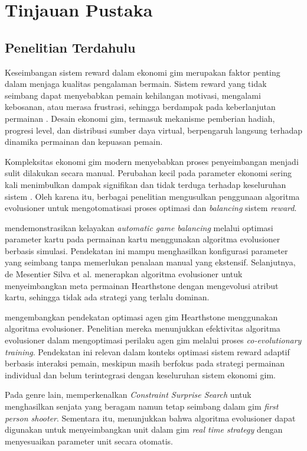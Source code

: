 \chapter{Tinjauan Pustaka}\label{ch:literature}

\section{Penelitian Terdahulu}\label{}

Keseimbangan sistem reward dalam ekonomi gim merupakan faktor penting dalam menjaga kualitas pengalaman bermain. Sistem reward yang tidak seimbang dapat menyebabkan pemain kehilangan motivasi, mengalami kebosanan, atau merasa frustrasi, sehingga berdampak pada keberlanjutan permainan \citep{Holmberg2021}. Desain ekonomi gim, termasuk mekanisme pemberian hadiah, progresi level, dan distribusi sumber daya virtual, berpengaruh langsung terhadap dinamika permainan dan kepuasan pemain.

Kompleksitas ekonomi gim modern menyebabkan proses penyeimbangan menjadi sulit dilakukan secara manual. Perubahan kecil pada parameter ekonomi sering kali menimbulkan dampak signifikan dan tidak terduga terhadap keseluruhan sistem \citep{Volz2016}. Oleh karena itu, berbagai penelitian mengusulkan penggunaan algoritma evolusioner untuk mengotomatisasi proses optimasi dan \textit{balancing} sistem \textit{reward}.

\cite{Volz2016} mendemonstrasikan kelayakan \textit{automatic game balancing} melalui optimasi parameter kartu pada permainan kartu menggunakan algoritma evolusioner berbasis simulasi. Pendekatan ini mampu menghasilkan konfigurasi parameter yang seimbang tanpa memerlukan penalaan manual yang ekstensif. Selanjutnya, de Mesentier Silva et al. \cite{deMesentierSilva2019} menerapkan algoritma evolusioner untuk menyeimbangkan meta permainan Hearthstone dengan mengevolusi atribut kartu, sehingga tidak ada strategi yang terlalu dominan.

\cite{garcia2020optimizing} mengembangkan pendekatan optimasi agen gim Hearthstone menggunakan algoritma evolusioner. Penelitian mereka menunjukkan efektivitas algoritma evolusioner dalam mengoptimasi perilaku agen gim melalui proses \textit{co-evolutionary training}. Pendekatan ini relevan dalam konteks optimasi sistem reward adaptif berbasis interaksi pemain, meskipun masih berfokus pada strategi permainan individual dan belum terintegrasi dengan keseluruhan sistem ekonomi gim.

Pada genre lain, \cite{Gravina2016} memperkenalkan \textit{Constraint Surprise Search} untuk menghasilkan senjata yang beragam namun tetap seimbang dalam gim \textit{first person shooter}. Sementara itu, \cite{Morosan2017} menunjukkan bahwa algoritma evolusioner dapat digunakan untuk menyeimbangkan unit dalam gim \textit{real time strategy} dengan menyesuaikan parameter unit secara otomatis.

